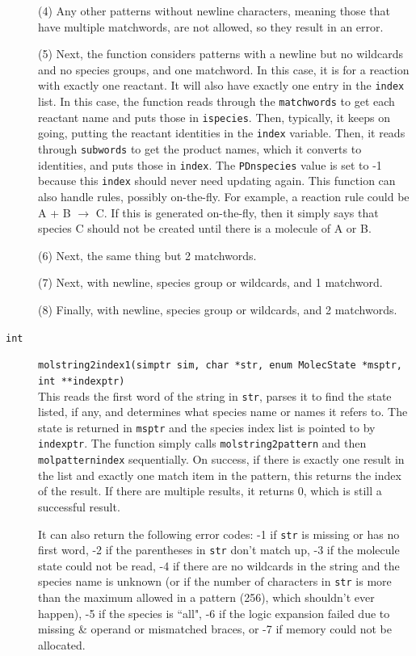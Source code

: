\documentclass {scrbook}
\newcommand {\ttt} {\texttt}
\begin{document}
\begin{description}
(4) Any other patterns without newline characters, meaning those that have multiple matchwords, are not allowed, so they result in an error.

(5) Next, the function considers patterns with a newline but no wildcards and no species groups, and one matchword. In this case, it is for a reaction with exactly one reactant. It will also have exactly one entry in the \ttt{index} list. In this case, the function reads through the \ttt{matchwords} to get each reactant name and puts those in \ttt{ispecies}. Then, typically, it keeps on going, putting the reactant identities in the \ttt{index} variable. Then, it reads through \ttt{subwords} to get the product names, which it converts to identities, and puts those in \ttt{index}. The \ttt{PDnspecies} value is set to -1 because this \ttt{index} should never need updating again. This function can also handle rules, possibly on-the-fly. For example, a reaction rule could be A + B $\rightarrow$ C. If this is generated on-the-fly, then it simply says that species C should not be created until there is a molecule of A or B.

(6) Next, the same thing but 2 matchwords.

(7) Next, with newline, species group or wildcards, and 1 matchword.

(8) Finally, with newline, species group or wildcards, and 2 matchwords.

\item[\ttt{int}]
\ttt{molstring2index1(simptr sim, char *str, enum MolecState *msptr, int **indexptr)}
\hfill \\
This reads the first word of the string in \ttt{str}, parses it to find the state listed, if any, and determines what species name or names it refers to. The state is returned in \ttt{msptr} and the species index list is pointed to by \ttt{indexptr}. The function simply calls \ttt{molstring2pattern} and then \ttt{molpatternindex} sequentially. On success, if there is exactly one result in the list and exactly one match item in the pattern, this returns the index of the result. If there are multiple results, it returns 0, which is still a successful result.

It can also return the following error codes: -1 if \ttt{str} is missing or has no first word, -2 if the parentheses in \ttt{str} don't match up, -3 if the molecule state could not be read, -4 if there are no wildcards in the string and the species name is unknown (or if the number of characters in \ttt{str} is more than the maximum allowed in a pattern (256), which shouldn't ever happen), -5 if the species is ``all", -6 if the logic expansion failed due to missing \& operand or mismatched braces, or -7 if memory could not be allocated.


\end{description}
\end{document}
